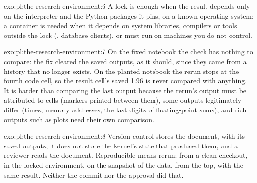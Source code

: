 \begin{solution}{exo:pl:the-research-environment:6}
A lock is enough when the result depends only on the interpreter and the Python packages it pins, on a known operating system; a container is
needed when it depends on system libraries, compilers or tools outside the lock (, database clients), or must run on machines
you do not control.
\end{solution}

\begin{solution}{exo:pl:the-research-environment:7}
On the fixed notebook the check has nothing to compare: the fix cleared the saved outputs, as it should, since they came from a history that no
longer exists. On the planted notebook the rerun stops at the fourth code cell, so the result cell's saved 1.96 is never compared with anything.
It is harder than comparing the last output because the rerun's output must be attributed to cells (markers printed between them), some outputs
legitimately differ (times, memory addresses, the last digits of floating-point sums), and rich outputs such as plots need their own comparison.
\end{solution}

\begin{solution}{exo:pl:the-research-environment:8}
Version control stores the document, with its saved outputs; it does not store the kernel's state that produced them, and a reviewer reads the
document. Reproducible means rerun: from a clean checkout, in the locked environment, on the snapshot of the data, from the top, with the same
result. Neither the commit nor the approval did that.
\end{solution}

